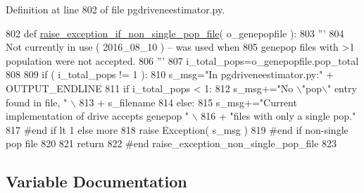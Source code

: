 Definition at line 802 of file pgdriveneestimator.\+py.


\begin{DoxyCode}
802 \textcolor{keyword}{def }\hyperlink{namespacenegui_1_1pgdriveneestimator_ac98833013f11d6aa3544b0fc60951632}{raise\_exception\_if\_non\_single\_pop\_file}( o\_genepopfile ):
803     \textcolor{stringliteral}{'''}
804 \textcolor{stringliteral}{    Not currently in use ( 2016\_08\_10 ) -- was used when}
805 \textcolor{stringliteral}{    genepop files with >1 population were not accepted.}
806 \textcolor{stringliteral}{    '''}
807     i\_total\_pops=o\_genepopfile.pop\_total
808 
809     \textcolor{keywordflow}{if} ( i\_total\_pops != 1 ):
810         s\_msg=\textcolor{stringliteral}{"In pgdriveneestimator.py:"} + OUTPUT\_ENDLINE
811         \textcolor{keywordflow}{if} i\_total\_pops < 1:
812             s\_msg+=\textcolor{stringliteral}{"No \(\backslash\)"pop\(\backslash\)" entry found in file, "} \(\backslash\)
813                     + s\_filename
814         \textcolor{keywordflow}{else}:
815             s\_msg+=\textcolor{stringliteral}{"Current implementation of drive accepts genepop "} \(\backslash\)
816                 + \textcolor{stringliteral}{"files with only a single pop."}
817         \textcolor{comment}{#end if lt 1 else more}
818         \textcolor{keywordflow}{raise} Exception( s\_msg )
819     \textcolor{comment}{#end if non-single pop file}
820 
821     \textcolor{keywordflow}{return}
822 \textcolor{comment}{#end raise\_exception\_non\_single\_pop\_file}
823 
\end{DoxyCode}


\subsection{Variable Documentation}
